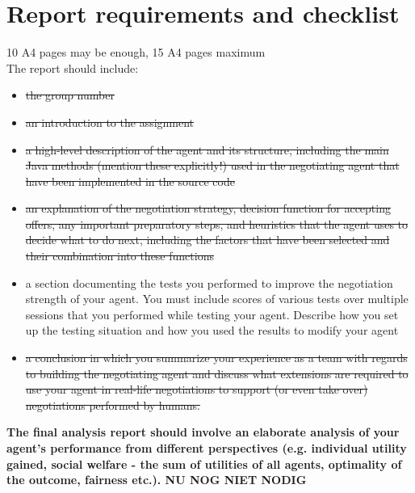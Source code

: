 \documentclass[11pt,a4paper]{article}
\begin{document}
\section*{Report requirements and checklist}

10 A4 pages may be enough, 15 A4 pages maximum\\
The report should include:\\
\begin{itemize}
\item \st{the group number}
\item \st{an introduction to the assignment}
\item \st{a high-level description of the agent and its structure, including the main Java methods (mention
these explicitly!) used in the negotiating agent that have been implemented in the source code}
\item \st{an explanation of the negotiation strategy, decision function for accepting offers, any important
preparatory steps, and heuristics that the agent uses to decide what to do next, including the factors
that have been selected and their combination into these functions}
\item a section documenting the tests you performed to improve the negotiation strength of your agent.
You must include scores of various tests over multiple sessions that you performed while testing
your agent. Describe how you set up the testing situation and how you used the results to modify
your agent
\item \st{a conclusion in which you summarize your experience as a team with regards to building the
negotiating agent and discuss what extensions are required to use your agent in real-life negotiations
to support (or even take over) negotiations performed by humans.}
\end{itemize}

\textbf{The final analysis report should involve an elaborate analysis of your agent's performance from different perspectives (e.g. individual utility gained, social welfare - the sum of utilities of all agents, optimality of the outcome, fairness etc.). NU NOG NIET NODIG}
\end{document}
